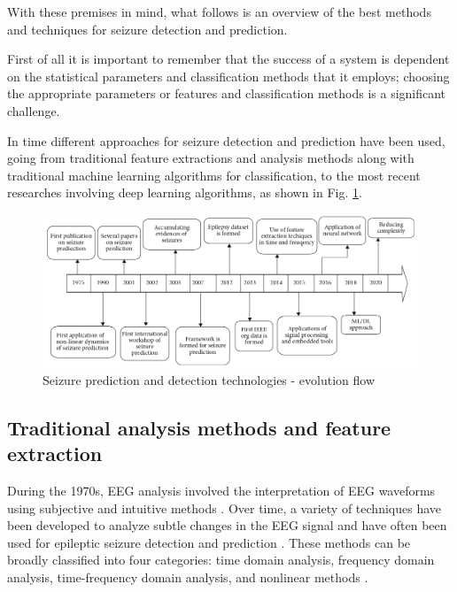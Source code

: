With these premises in mind, what follows is an overview of the best methods and techniques for seizure detection and prediction.

First of all it is important to remember that the success of a system is dependent on the statistical parameters and classification methods that it employs; choosing the appropriate parameters or features and classification methods is a significant challenge.

In time different approaches for seizure detection and prediction have been used, going from traditional feature extractions and analysis methods along with traditional machine learning algorithms for classification, to the most recent researches involving deep learning algorithms, as shown in Fig. \ref{fig:seizure-prediction-evolution-flow}.

\begin{figure}[ht]
    \centering
    \includegraphics[width=1.0\textwidth]{images/State-of-art/seizure-prediction-evolution-flow.png}
    \caption{Seizure prediction and detection technologies - evolution flow \cite{natu_review_2022}}
    \label{fig:seizure-prediction-evolution-flow}
\end{figure}

\subsection{Traditional analysis methods and feature extraction}
During the 1970s, EEG analysis involved the interpretation of \gls{EEG} waveforms using subjective and intuitive methods \cite{callaway_coupling_1974}. Over time, a variety of techniques have been developed to analyze subtle changes in the \gls{EEG} signal and have often been used for epileptic seizure detection and prediction \cite{natu_review_2022}. These methods can be broadly classified into four categories: time domain analysis, frequency domain analysis, time-frequency domain analysis, and nonlinear methods \cite{acharya_automated_2013}.

